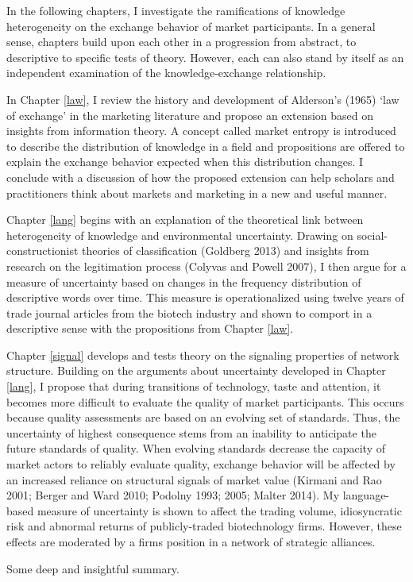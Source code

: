 In the following chapters, I investigate the ramifications of knowledge heterogeneity on the exchange behavior of market participants. In a general sense, chapters build upon each other in a progression from abstract, to descriptive to specific tests of theory. However, each can also stand by itself as an independent examination of the knowledge-exchange relationship. 

In Chapter \ref{law}, I review the history and development of Alderson's (1965) `law of exchange' in the marketing literature and propose an extension based on insights from information theory. A concept called market entropy is introduced to describe the distribution of knowledge in a field and propositions are offered to explain the exchange behavior expected when this distribution changes. I conclude with a discussion of how the proposed extension can help scholars and practitioners think about markets and marketing in a new and useful manner. 

Chapter \ref{lang} begins with an explanation of the theoretical link between heterogeneity of knowledge and environmental uncertainty. Drawing on social-constructionist theories of classification (Goldberg 2013) and insights from research on the legitimation process (Colyvas and Powell 2007), I then argue for a measure of uncertainty based on changes in the frequency distribution of descriptive words over time. This measure is operationalized using twelve years of trade journal articles from the biotech industry and shown to comport in a descriptive sense with the propositions from Chapter \ref{law}. 

Chapter \ref{signal} develops and tests theory on the signaling properties of network structure. Building on the arguments about uncertainty developed in Chapter \ref{lang}, I propose that during transitions of technology, taste and attention, it becomes more difficult to evaluate the quality of market participants. This occurs because quality assessments are based on an evolving set of standards. Thus, the uncertainty of highest consequence stems from an inability to anticipate the future standards of quality. When evolving standards decrease the capacity of market actors to reliably evaluate quality, exchange behavior will be affected by an increased reliance on structural signals of market value (Kirmani and Rao 2001; Berger and Ward 2010; Podolny 1993; 2005; Malter 2014). My language-based measure of uncertainty is shown to affect the trading volume, idiosyncratic risk and abnormal returns of publicly-traded biotechnology firms. However, these effects are moderated by a firms position in a network of strategic alliances.

Some deep and insightful summary.
